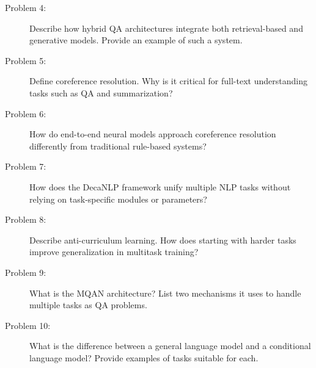 \documentclass[10pt]{article}
\begin{document}
\begin{description}
\pagebreak

\item[Problem 4:] Describe how hybrid QA architectures integrate both retrieval-based and generative models. Provide an example of such a system.

\pagebreak

\item[Problem 5:] Define coreference resolution. Why is it critical for full-text understanding tasks such as QA and summarization?

\pagebreak

\item[Problem 6:] How do end-to-end neural models approach coreference resolution differently from traditional rule-based systems?

\pagebreak

\item[Problem 7:] How does the DecaNLP framework unify multiple NLP tasks without relying on task-specific modules or parameters?

\pagebreak

\item[Problem 8:] Describe anti-curriculum learning. How does starting with harder tasks improve generalization in multitask training?

\pagebreak

\item[Problem 9:] What is the MQAN architecture? List two mechanisms it uses to handle multiple tasks as QA problems.

\pagebreak

\item[Problem 10:] What is the difference between a general language model and a conditional language model? Provide examples of tasks suitable for each.

\end{description}
\end{document}
